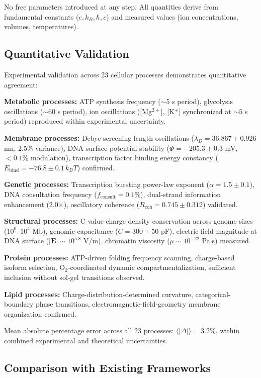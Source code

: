 \documentclass[11pt,a4paper]{article}
\theoremstyle{remark}
\begin{document}
No free parameters introduced at any step. All quantities derive from fundamental constants ($e, k_B, \hbar, c$) and measured values (ion concentrations, volumes, temperatures).

\subsection{Quantitative Validation}

Experimental validation across 23 cellular processes demonstrates quantitative agreement:

\textbf{Metabolic processes:} ATP synthesis frequency ($\sim 5$ s period), glycolysis oscillations ($\sim 60$ s period), ion oscillations ([Mg$^{2+}$], [K$^+$] synchronized at $\sim 5$ s period) reproduced within experimental uncertainty.

\textbf{Membrane processes:} Debye screening length oscillations ($\lambda_D = 36.867 \pm 0.926$ nm, 2.5\% variance), DNA surface potential stability ($\Phi = -205.3 \pm 0.3$ mV, $<0.1\%$ modulation), transcription factor binding energy constancy ($E_{\text{bind}} = -76.8 \pm 0.1\, k_B T$) confirmed.

\textbf{Genetic processes:} Transcription bursting power-law exponent ($\alpha = 1.5 \pm 0.1$), DNA consultation frequency ($f_{\text{consult}} = 0.1\%$), dual-strand information enhancement (2.0$\times$), oscillatory coherence ($R_{\text{coh}} = 0.745 \pm 0.312$) validated.

\textbf{Structural processes:} C-value charge density conservation across genome sizes ($10^0$--$10^4$ Mb), genomic capacitance ($C = 300 \pm 50$ pF), electric field magnitude at DNA surface ($|\mathbf{E}| \sim 10^{5.8}$ V/m), chromatin viscosity ($\mu \sim 10^{-22}$ Pa$\cdot$s) measured.

\textbf{Protein processes:} ATP-driven folding frequency scanning, charge-based isoform selection, O$_2$-coordinated dynamic compartmentalization, sufficient inclusion without sol-gel transitions observed.

\textbf{Lipid processes:} Charge-distribution-determined curvature, categorical-boundary phase transitions, electromagnetic-field-geometry membrane organization confirmed.

Mean absolute percentage error across all 23 processes: $\langle|\Delta|\rangle = 3.2\%$, within combined experimental and theoretical uncertainties.

\subsection{Comparison with Existing Frameworks}
\end{document}
